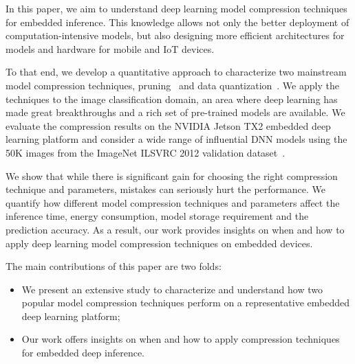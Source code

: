 In this paper, we aim to understand deep learning model compression techniques for embedded inference. This knowledge allows not only the
better deployment of computation-intensive models, but also designing more efficient architectures for models and hardware for mobile and
IoT devices.

To that end, we develop a quantitative approach  to characterize two mainstream model compression techniques, pruning~\cite{} and data
quantization~\cite{}. We apply the techniques to the image classification domain, an area where deep learning has made great breakthroughs
and a rich set of pre-trained models are available. We evaluate the compression results on the NVIDIA Jetson TX2 embedded deep learning
platform and consider a wide range of influential DNN models using the 50K images from the ImageNet ILSVRC 2012 validation dataset~\cite{}.

We show that while there is significant gain for choosing the right compression technique and parameters, mistakes can seriously hurt the
performance. We quantify how different model compression techniques and parameters affect the inference time, energy consumption, model
storage requirement and the prediction accuracy. As a result, our work provides insights on when and how to apply deep learning model
compression techniques on embedded devices.

The main contributions of this paper are two folds:

\begin{itemize}
\item We present an extensive study to characterize and understand how two popular model compression techniques perform on a
    representative embedded deep learning platform;
\item Our work offers insights on when and how to apply compression techniques for embedded deep inference.
\end{itemize}

